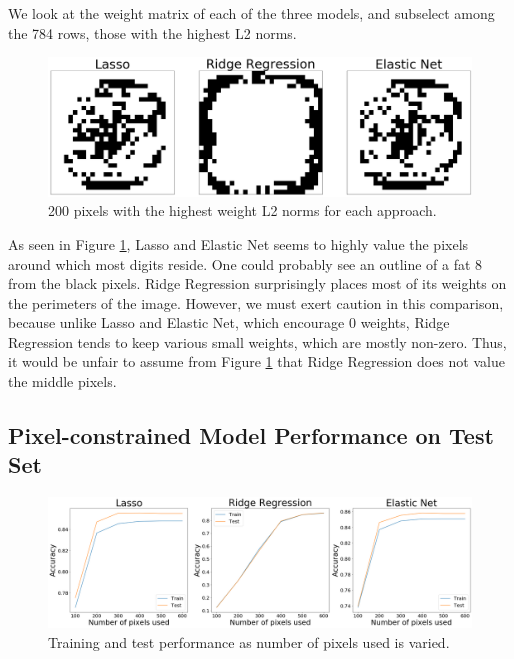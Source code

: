 \documentclass[letterpaper, 10 pt, conference]{ieeeconf}  %
\begin{document}
We look at the weight matrix of each of the three models, and subselect among the 784 rows, those with the highest L2 norms. 

\begin{figure}[htp] 
\centering
\includegraphics[width=\textwidth]{images/important_pixels_all.png}
\caption{200 pixels with the highest weight L2 norms for each approach.}
\label{fig:important_pixels_all}
\end{figure}

As seen in Figure \ref{fig:important_pixels_all}, Lasso and Elastic Net seems to highly value the pixels around which most digits reside. One could probably see an outline of a fat 8 from the black pixels. Ridge Regression surprisingly places most of its weights on the perimeters of the image. However, we must exert caution in this comparison, because unlike Lasso and Elastic Net, which encourage 0 weights, Ridge Regression tends to keep various small weights, which are mostly non-zero. Thus, it would be unfair to assume from Figure \ref{fig:important_pixels_all} that Ridge Regression does not value the middle pixels.

\subsection{Pixel-constrained Model Performance on Test Set}
\begin{figure}[t!] 
\centering
\includegraphics[width=\textwidth]{images/perf_feature_selection.png}
\caption{Training and test performance as number of pixels used is varied.}
\label{fig:perf_feature_selection}
\end{figure}
\end{document}
